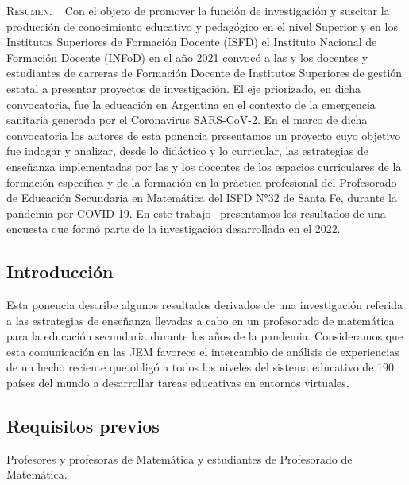 \begin{center}
	\begin{minipage}{0.75\linewidth} \small
		\textsc{Resumen}. ~
		Con el objeto de promover la función de investigación y suscitar la producción de conocimiento educativo y pedagógico en el nivel Superior y en los Institutos Superiores de Formación Docente (ISFD) el Instituto Nacional de Formación Docente (INFoD) en el año 2021 convocó a las y los docentes y estudiantes de carreras de Formación Docente de Institutos Superiores de gestión estatal a presentar proyectos de investigación. El eje priorizado, en dicha convocatoria, fue la educación en Argentina en el contexto de la emergencia sanitaria generada por el Coronavirus SARS-CoV-2. En el marco de dicha convocatoria los autores de esta ponencia presentamos un proyecto cuyo objetivo fue indagar y analizar, desde lo didáctico y lo curricular, las estrategias de enseñanza implementadas por las y los docentes de los espacios curriculares de la formación específica y de la formación en la práctica profesional del Profesorado de Educación Secundaria en Matemática del ISFD N°32 de Santa Fe, durante la pandemia por COVID-19. En este trabajo  presentamos los resultados de una encuesta que formó parte de la investigación desarrollada en el 2022.
	\end{minipage}
\end{center}

\subsection{Introducción}

Esta ponencia describe algunos resultados derivados de una investigación referida a las estrategias de enseñanza llevadas a cabo en un profesorado de matemática para la educación secundaria durante los años de la pandemia. Consideramos que esta comunicación en las JEM favorece el intercambio de análisis de experiencias de un hecho reciente que obligó a todos los niveles del sistema educativo de 190 países del mundo a desarrollar tareas educativas en entornos virtuales.

\subsection{Requisitos previos}

Profesores y profesoras de Matemática y estudiantes de Profesorado de Matemática.

